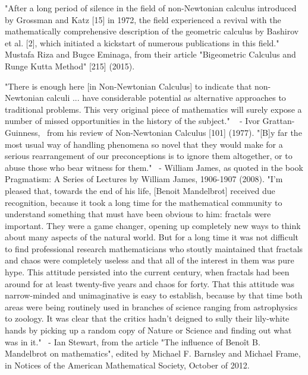 \documentclass[12pt]{article}
\begin{document}
"After a long period of silence in the field of non-Newtonian calculus introduced by Grossman and Katz [15] in 1972, the field experienced a revival with the mathematically comprehensive description of the geometric calculus by Bashirov et al. [2], which initiated a kickstart of numerous publications in this field."
Mustafa Riza and Bugce Eminaga, from their article "Bigeometric Calculus and Runge Kutta Method" [215] (2015).

"There is enough here [in Non-Newtonian Calculus] to indicate that non-Newtonian calculi ... have considerable potential as alternative approaches to traditional problems. This very original piece of mathematics will surely expose a number of missed opportunities in the history of the subject."   - Ivor Grattan-Guinness,  from his review of Non-Newtonian Calculus [101] (1977).
"[B]y far the most usual way of handling phenomena so novel that they would make for a serious rearrangement of our preconceptions is to ignore them altogether, or to abuse those who bear witness for them."  - William James, as quoted in the book Pragmatism: A Series of Lectures by William James, 1906-1907 (2008).
"I'm pleased that, towards the end of his life, [Benoit Mandelbrot] received due recognition, because it took a long time for the mathematical community to understand something that must have been obvious to him: fractals were important. They were a game changer, opening up completely new ways to think about many aspects of the natural world. But for a long time it was not difficult to find professional research mathematicians who stoutly maintained that fractals and chaos were completely useless and that all of the interest in them was pure hype. This attitude persisted into the current century, when fractals had been around for at least twenty-five years and chaos for forty. That this attitude was narrow-minded and unimaginative is easy to establish, because by that time both areas were being routinely used in branches of science ranging from astrophysics to zoology. It was clear that the critics hadn’t deigned to sully their lily-white hands by picking up a random copy of Nature or Science and finding out what was in it."  - Ian Stewart, from the article "The influence of Benoît B. Mandelbrot on mathematics", edited by Michael F. Barnsley and Michael Frame, in Notices of the American Mathematical Society, October of 2012.  
\end{document}
